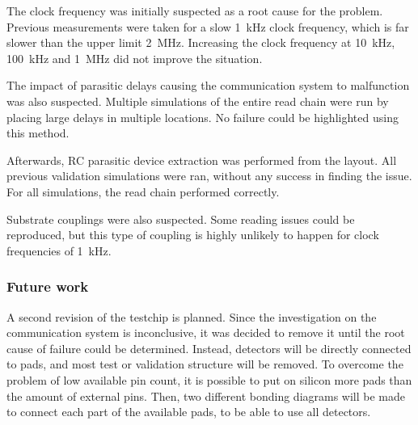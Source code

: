 The clock frequency was initially suspected as a root cause for the problem.
Previous measurements were taken for a slow \SI{1}{\kilo\hertz} clock frequency, which is far slower than the upper limit \SI{2}{\mega\hertz}.
Increasing the clock frequency at \SI{10}{\kilo\hertz}, \SI{100}{\kilo\hertz} and \SI{1}{\mega\hertz} did not improve the situation.

The impact of parasitic delays causing the communication system to malfunction was also suspected.
Multiple simulations of the entire read chain were run by placing large delays in multiple locations.
No failure could be highlighted using this method.

Afterwards, RC parasitic device extraction was performed from the layout.
All previous validation simulations were ran, without any success in finding the issue.
For all simulations, the read chain performed correctly.

Substrate couplings were also suspected.
Some reading issues could be reproduced, but this type of coupling is highly unlikely to happen for clock frequencies of \SI{1}{\kilo\hertz}.

\subsubsection{Future work}

A second revision of the testchip is planned.
Since the investigation on the communication system is inconclusive, it was decided to remove it until the root cause of failure could be determined.
Instead, detectors will be directly connected to pads, and most test or validation structure will be removed.
To overcome the problem of low available pin count, it is possible to put on silicon more pads than the amount of external pins.
Then, two different bonding diagrams will be made to connect each part of the available pads, to be able to use all detectors.
